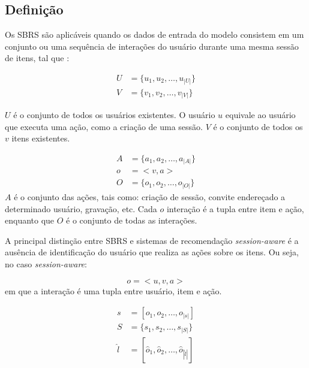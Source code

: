 \subsection{Definição}

Os SBRS são aplicáveis quando os dados
 de entrada do modelo consistem em um conjunto ou uma sequência de interações do usuário
 durante uma mesma sessão de itens, tal que \cite{survey_wang_2021}:

 \begin{equation*}
  \begin{aligned}
  U & = \{u_1, u_2, \ldots, u_{|U|}\} \\
  V & = \{v_1, v_2, \ldots, v_{|V|}\}
\end{aligned}
\end{equation*}

$U$ é o conjunto de todos os usuários existentes. O usuário $u$ equivale ao
usuário que executa uma ação, como a criação de uma sessão. $V$ é o conjunto de
todos os $v$ itens existentes.

\begin{equation*}
  \begin{aligned}
  A & = \{a_1, a_2, \ldots, a_{|A|}\} \\
  o & = <v, a> \\
  O & = \{o_1, o_2, \ldots, o_{|O|}\}
  \end{aligned}
  \end{equation*}
$A$ é o conjunto das ações, tais como: criação de sessão, convite endereçado a
  determinado usuário, gravação, etc. Cada $o$ interação é a tupla entre item e
  ação, enquanto que $O$ é o conjunto de todas as interações.

  A principal distinção entre SBRS e sistemas de recomendação \textit{session-aware}
  é a ausência de identificação do usuário que realiza as ações sobre os itens.
  Ou seja, no caso \textit{session-aware}:

  \begin{equation}
    o = <u, v, a>
    \end{equation}
  em que a interação é uma tupla entre usuário, item e ação.

  \begin{equation*}
  \begin{aligned}
  s & = [o_1, o_2, \ldots, o_{|s|}] \\
  S & = \{s_1, s_2, \ldots, s_{|S|}\} \\
  \hat{l} & = [\hat{o}_1, \hat{o}_2, \ldots, \hat{o}_{|\hat{l}|}]
  \end{aligned}
  \end{equation*}
  
